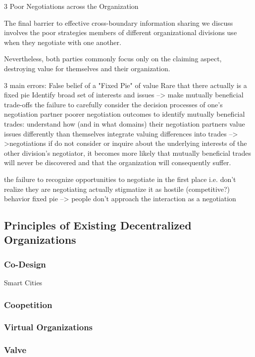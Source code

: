     3 Poor Negotiations across the Organization
    
The final barrier to effective cross-boundary information sharing we discuss involves the poor strategies members of different organizational divisions use when they negotiate with one another.

Nevertheless, both parties commonly focus only on the claiming aspect, destroying value for themselves and their organization.

3 main errors:
    False belief of a "Fixed Pie" of value
        Rare that there actually is a fixed pie
        Identify broad set of interests and issues --> make mutually beneficial trade-offs
    the failure to carefully consider the decision processes of one’s negotiation partner
        poorer negotiation outcomes
        to identify mutually beneficial trades:
            understand how (and in what domains) their negotiation partners value issues differently than themselves
            integrate valuing differences into trades --> >negotiations
            if do not consider or inquire about the underlying interests of the other division’s negotiator, it becomes more likely that mutually beneficial trades will never be discovered
                and that the organization will consequently suffer.

            
    the failure to recognize opportunities to negotiate in the first place
        i.e. don't realize they are negotiating
        actually stigmatize it as hostile (competitive?) behavior
        fixed pie --> people don't approach the interaction as a negotiation
    
    
    

\subsection{Principles of Existing Decentralized Organizations}

\subsubsection{Co-Design}
Smart Cities

\subsubsection{Coopetition}

\subsubsection{Virtual Organizations}

\subsubsection{Valve}